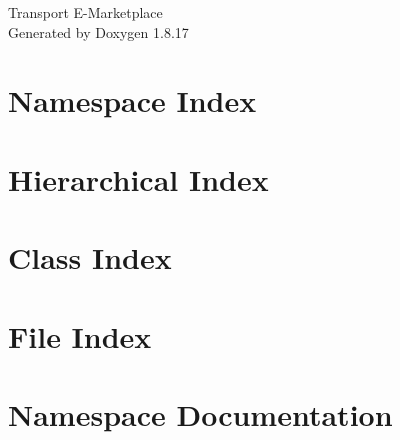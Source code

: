 \let\mypdfximage\pdfximage\def\pdfximage{\immediate\mypdfximage}\documentclass[twoside]{book}
\newcommand{\+}{\discretionary{\mbox{\scriptsize$\hookleftarrow$}}{}{}}
\newcommand{\clearemptydoublepage}{%
  \newpage{\pagestyle{empty}\cleardoublepage}%
}
\begin{document}
\hypersetup{pageanchor=false,
             bookmarksnumbered=true,
             pdfencoding=unicode
            }
\begin{titlepage}
\vspace*{7cm}
\begin{center}%
{\Large Transport E-\/\+Marketplace }\\
\vspace*{1cm}
{\large Generated by Doxygen 1.8.17}\\
\end{center}
\end{titlepage}
\clearemptydoublepage
{}
\tableofcontents
\clearemptydoublepage
{}
\hypersetup{pageanchor=true}

\chapter{Namespace Index}

\chapter{Hierarchical Index}

\chapter{Class Index}

\chapter{File Index}

\chapter{Namespace Documentation}

\end{document}
